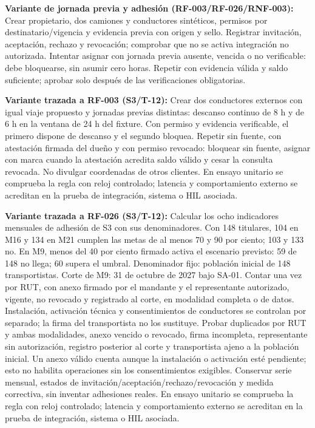 \par\noindent\textbf{Variante de jornada previa y adhesión (RF-003/RF-026/RNF-003):} Crear propietario, dos camiones y conductores sintéticos, permisos por destinatario/vigencia y evidencia previa con origen y sello. Registrar invitación, aceptación, rechazo y revocación; comprobar que no se activa integración no autorizada. Intentar asignar con jornada previa ausente, vencida o no verificable: debe bloquearse, sin asumir cero horas. Repetir con evidencia válida y saldo suficiente; aprobar solo después de las verificaciones obligatorias.\par

\par\noindent\textbf{Variante trazada a RF-003 (S3/T-12):} Crear dos conductores externos con igual viaje propuesto y jornadas previas distintas: descanso continuo de 8 h y de 6 h en la ventana de 24 h del fixture. Con permiso y evidencia verificable, el primero dispone de descanso y el segundo bloquea. Repetir sin fuente, con atestación firmada del dueño y con permiso revocado: bloquear sin fuente, asignar con marca cuando la atestación acredita saldo válido y cesar la consulta revocada. No divulgar coordenadas de otros clientes. En ensayo unitario se comprueba la regla con reloj controlado; latencia y comportamiento externo se acreditan en la prueba de integración, sistema o HIL asociada.\par

\par\noindent\textbf{Variante trazada a RF-026 (S3/T-12):} Calcular los ocho indicadores mensuales de adhesión de S3 con sus denominadores. Con 148 titulares, 104 en M16 y 134 en M21 cumplen las metas de al menos 70 y 90 por ciento; 103 y 133 no. En M9, menos del 40 por ciento firmado activa el escenario previsto: 59 de 148 no llega; 60 supera el umbral. Denominador fijo: población inicial de 148 transportistas. Corte de M9: 31 de octubre de 2027 bajo SA-01. Contar una vez por RUT, con anexo firmado por el mandante y el representante autorizado, vigente, no revocado y registrado al corte, en modalidad completa o de datos. Instalación, activación técnica y consentimientos de conductores se controlan por separado; la firma del transportista no los sustituye. Probar duplicados por RUT y ambas modalidades, anexo vencido o revocado, firma incompleta, representante sin autorización, registro posterior al corte y transportista ajeno a la población inicial. Un anexo válido cuenta aunque la instalación o activación esté pendiente; esto no habilita operaciones sin los consentimientos exigibles. Conservar serie mensual, estados de invitación/aceptación/rechazo/revocación y medida correctiva, sin inventar adhesiones reales. En ensayo unitario se comprueba la regla con reloj controlado; latencia y comportamiento externo se acreditan en la prueba de integración, sistema o HIL asociada.\par

